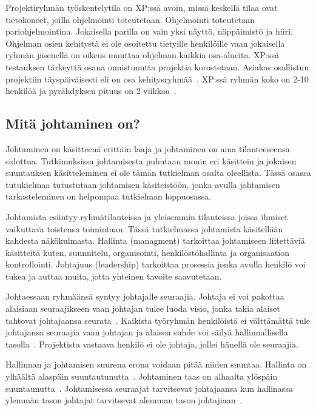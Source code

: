 \documentclass[finnish]{tktltiki2}
\theoremstyle{definition}
\theoremstyle{remark}
\begin{document}
Projektiryhmän työskentelytila on XP:ssä avoin, missä keskellä tilaa ovat tietokoneet, joilla ohjelmointi toteutetaan. Ohjelmointi toteutetaan pariohjelmointina. Jokaisella parilla on vain yksi näyttö, näppäimistö ja hiiri. Ohjelman osien kehitystä ei ole osoitettu tietyille henkilöille vaan jokaisella ryhmän jäsenellä on oikeus muuttaa ohjelman kaikkia osa-alueita. XP:ssä testauksen tärkeyttä osana onnistunutta projektia korostetaan. Asiakas osallistuu projektiin täyspäiväisesti eli on osa kehitysryhmää~\cite{796139}. XP:ssä ryhmän koko on 2-10 henkilöä ja pyrähdyksen pituus on 2 viikkoa~\cite{cohen2004introduction}. 

\subsection{Mitä johtaminen on?}

Johtaminen on käsitteenä erittäin laaja ja johtaminen on aina tilanteeseensa sidottua. Tutkimuksissa johtamisesta puhutaan monin eri käsittein ja jokaisen suuntauksen käsitteleminen ei ole tämän tutkielman osalta oleellista. Tässä osassa tutukielmaa tutustutaan johtamisen käsiteistöön, jonka avulla johtamisen tarkasteleminen on helpompaa tutkielman loppuosassa.

Johtamista esiintyy ryhmätilanteissa ja yleisemmin tilanteissa joissa ihmiset vaikuttava toistensa toimintaan. Tässä tutkielmassa johtamista käsitellään kahdesta näkökulmasta. Hallinta (managment) tarkoittaa johtamiseen liitettäviä käsitteitä kuten, suunnitelu, organisointi, henkilöstöhallinta ja organisaation kontrollointi. Johtajuus (leadership) tarkoittaa prosessia jonka avulla henkilö voi tukea ja auttaa muita, jotta yhteinen tavoite saavutetaan.

Johtaessaan ryhmäänsä syntyy johtajalle seuraajia. Johtaja ei voi pakottaa alaisiaan seuraajikseen vaan johtajan tulee luoda visio, jonka takia alaiset tahtovat johtajaansa seurata~\cite{raccoon2006leadership}. Kaikista työryhmän henkilöistä ei välttämättä tule johtajansa seuraajia vaan johtajan ja alaisen suhde voi säilyä hallinnallisella tasolla~\cite{raccoon2006leadership}. Projektista vastaava henkilö ei ole johtaja, jollei hänellä ole seuraajia. 

Hallinnan ja johtamisen suurena erona voidaan pitää niiden suuntaa. Hallinta on ylhäältä alaspäin suuntautunutta~\cite{raccoon2006leadership}. Johtaminen taas on alhaalta ylöspäin suuntaunutta~\cite{raccoon2006leadership}. Johtamisessa seuraajat tarvitsevat johtajaansa kun hallinassa ylemmän tason johtajat tarvitsevat alemman tason johtajiaan~\cite{raccoon2006leadership}.  
\end{document}
